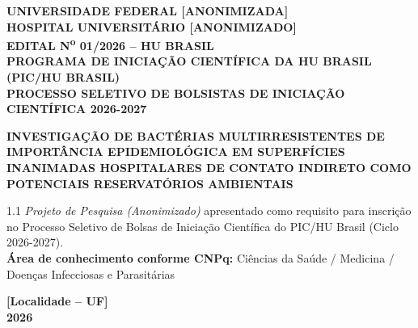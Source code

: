 \documentclass[12pt,a4paper]{article}
\begin{document}
\begin{titlepage}
    \begin{center}
        \textbf{UNIVERSIDADE FEDERAL [ANONIMIZADA]}\\
        \textbf{HOSPITAL UNIVERSITÁRIO [ANONIMIZADO]}\\
        \textbf{EDITAL N\textsuperscript{o} 01/2026 -- HU BRASIL}\\
        \textbf{PROGRAMA DE INICIAÇÃO CIENTÍFICA DA HU BRASIL (PIC/HU BRASIL)}\\
        \textbf{PROCESSO SELETIVO DE BOLSISTAS DE INICIAÇÃO CIENTÍFICA 2026-2027}
        
        \vspace{4cm}
        
        \Large\textbf{INVESTIGAÇÃO DE BACTÉRIAS MULTIRRESISTENTES DE IMPORTÂNCIA EPIDEMIOLÓGICA EM SUPERFÍCIES INANIMADAS HOSPITALARES DE CONTATO INDIRETO COMO POTENCIAIS RESERVATÓRIOS AMBIENTAIS}
        
        \vspace{4cm}
        
        \begin{flushright}
            \begin{minipage}{9.5cm}
                \begin{spacing}{1.1}
                    \textit{Projeto de Pesquisa (Anonimizado)} apresentado como requisito para inscrição no Processo Seletivo de Bolsas de Iniciação Científica do PIC/HU Brasil (Ciclo 2026-2027).\\
                    
                    \textbf{Área de conhecimento conforme CNPq:} Ciências da Saúde / Medicina / Doenças Infecciosas e Parasitárias
                \end{spacing}
            \end{minipage}
        \end{flushright}
        
        \vfill
        
        \textbf{[Localidade -- UF]}\\
        \textbf{2026}
    \end{center}
\end{titlepage}

\newpage
{} %

\tableofcontents
\newpage
\end{document}
